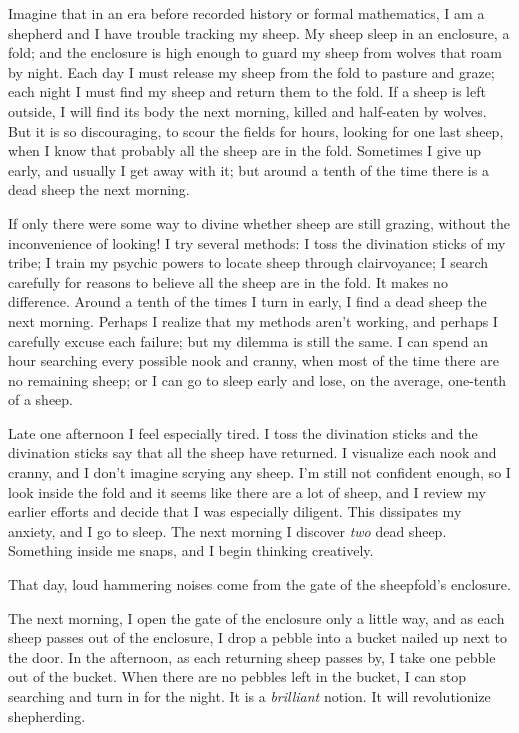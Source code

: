\hr

{
 Imagine that in an era before recorded history or formal
mathematics, I am a shepherd and I have trouble tracking my sheep. My
sheep sleep in an enclosure, a fold; and the enclosure is high enough
to guard my sheep from wolves that roam by night. Each day I must
release my sheep from the fold to pasture and graze; each night I must
find my sheep and return them to the fold. If a sheep is left outside,
I will find its body the next morning, killed and half-eaten by wolves.
But it is so discouraging, to scour the fields for hours, looking for
one last sheep, when I know that probably all the sheep are in the
fold. Sometimes I give up early, and usually I get away with it; but
around a tenth of the time there is a dead sheep the next morning.}

{
 If only there were some way to divine whether sheep are still
grazing, without the inconvenience of looking! I try several methods: I
toss the divination sticks of my tribe; I train my psychic powers to
locate sheep through clairvoyance; I search carefully for reasons to
believe all the sheep are in the fold. It makes no difference. Around a
tenth of the times I turn in early, I find a dead sheep the next
morning. Perhaps I realize that my methods aren't
working, and perhaps I carefully excuse each failure; but my dilemma is
still the same. I can spend an hour searching every possible nook and
cranny, when most of the time there are no remaining sheep; or I can go
to sleep early and lose, on the average, one-tenth of a sheep.}

{
 Late one afternoon I feel especially tired. I toss the divination
sticks and the divination sticks say that all the sheep have returned.
I visualize each nook and cranny, and I don't imagine
scrying any sheep. I'm still not confident enough, so I
look inside the fold and it seems like there are a lot of sheep, and I
review my earlier efforts and decide that I was especially diligent.
This dissipates my anxiety, and I go to sleep. The next morning I
discover \textit{two} dead sheep. Something inside me snaps, and I
begin thinking creatively.}

{
 That day, loud hammering noises come from the gate of the
sheepfold's enclosure.}

{
 The next morning, I open the gate of the enclosure only a little
way, and as each sheep passes out of the enclosure, I drop a pebble
into a bucket nailed up next to the door. In the afternoon, as each
returning sheep passes by, I take one pebble out of the bucket. When
there are no pebbles left in the bucket, I can stop searching and turn
in for the night. It is a \textit{brilliant} notion. It will
revolutionize shepherding.}

